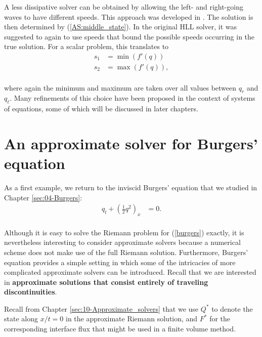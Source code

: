 \documentclass{SIAMbook2016}
\begin{document}
A less dissipative solver can be obtained by allowing the left- and
right-going waves to have different speeds. This approach was developed
in \cite{HLL}. The solution is then determined by
(\ref{AS:middle_state}). In the original HLL solver, it was suggested to
again to use speeds that bound the possible speeds occurring in the true
solution. For a scalar problem, this translates to\\
\begin{align*}
s_1 & = \min(f'(q)) \\
s_2 & = \max(f'(q)),
\end{align*}\\
where again the minimum and maximum are taken over all values between
\(q_r\) and \(q_\ell\). Many refinements of this choice have been
proposed in the context of systems of equations, some of which will be
discussed in later chapters.

\hypertarget{an-approximate-solver-for-burgers-equation}{%
\chapter{An approximate solver for Burgers'
equation}\label{an-approximate-solver-for-burgers-equation}}
\label{sec:11-Burgers_approximate}
As a first example, we return to the inviscid Burgers' equation that we
studied in Chapter \ref{sec:04-Burgers}:\\
\begin{align} \label{burgers}
q_t + \left(\frac{1}{2}q^2\right)_x & = 0.
\end{align}\\
Although it is easy to solve the Riemann problem for (\ref{burgers})
exactly, it is nevertheless interesting to consider approximate solvers
because a numerical scheme does not make use of the full Riemann
solution. Furthermore, Burgers' equation provides a simple setting in
which some of the intricacies of more complicated approximate solvers
can be introduced. Recall that we are interested in \textbf{approximate
solutions that consist entirely of traveling discontinuities}.

Recall from Chapter \ref{sec:10-Approximate_solvers} that we use \(Q^*\)
to denote the state along \(x/t = 0\) in the approximate Riemann
solution, and \(F^*\) for the corresponding interface flux that might be
used in a finite volume method.
\end{document}
